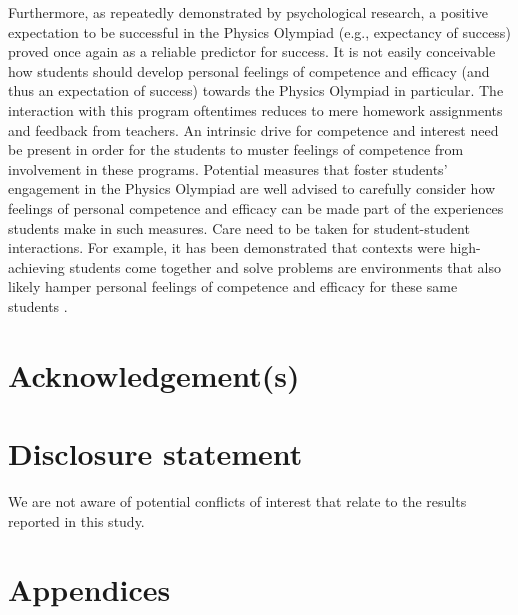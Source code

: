 \documentclass[]{interact}
\begin{document}
Furthermore, as repeatedly demonstrated by psychological research, a positive expectation to be successful in the Physics Olympiad (e.g., expectancy of success) proved once again as a reliable predictor for success. It is not easily conceivable how students should develop personal feelings of competence and efficacy (and thus an expectation of success) towards the Physics Olympiad in particular. The interaction with this program oftentimes reduces to mere homework assignments and feedback from teachers. An intrinsic drive for competence and interest need be present in order for the students to muster feelings of competence from involvement in these programs. Potential measures that foster students' engagement in the Physics Olympiad are well advised to carefully consider how feelings of personal competence and efficacy can be made part of the experiences students make in such measures. Care need to be taken for student-student interactions. For example, it has been demonstrated that contexts were high-achieving students come together and solve problems are environments that also likely hamper personal feelings of competence and efficacy for these same students \citep{Marsh.1995}.

\section*{Acknowledgement(s)}


\section*{Disclosure statement}

We are not aware of potential conflicts of interest that relate to the results reported in this study.



\newpage





\newpage
\section{Appendices}

\appendix
\end{document}
